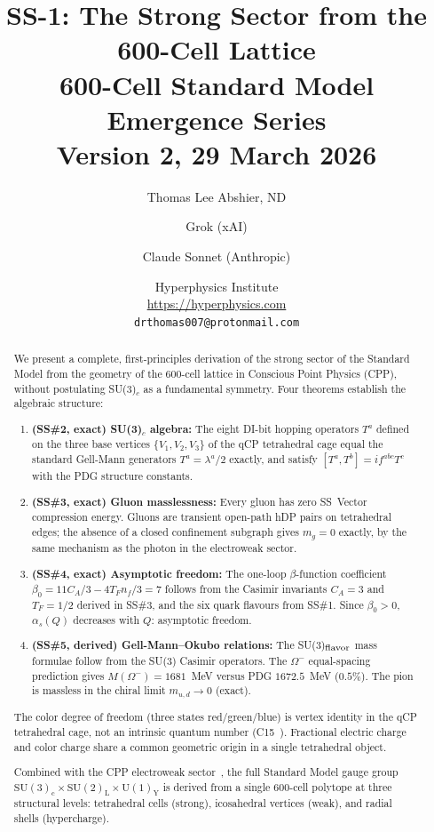 \documentclass[11pt,a4paper]{article}
\title{\textbf{SS-1: The Strong Sector from the 600-Cell Lattice}\\[6pt]
{\large 600-Cell Standard Model Emergence Series}\\[4pt]
{\normalsize Version 2, 29 March 2026}}
\author{Thomas Lee Abshier, ND \and Grok (xAI) \and Claude Sonnet (Anthropic)}
\date{\normalsize Hyperphysics Institute\\
\url{https://hyperphysics.com}\\
\texttt{drthomas007@protonmail.com}}
\newcommand{\as}{\alpha_s}
\begin{document}
\maketitle

\begin{abstract}
We present a complete, first-principles derivation of the strong
sector of the Standard Model from the geometry of the 600-cell
lattice in Conscious Point Physics (CPP), without postulating
SU(3)$_c$ as a fundamental symmetry.  Four theorems establish the
algebraic structure:

\begin{enumerate}
\item \textbf{(SS\#2, exact) SU(3)$_c$ algebra:}
The eight DI-bit hopping operators $T^a$ defined on the three base
vertices $\{V_1, V_2, V_3\}$ of the qCP tetrahedral cage equal
the standard Gell-Mann generators $T^a = \lambda^a/2$ exactly, and
satisfy $[T^a, T^b] = if^{abc}T^c$ with the PDG structure constants.

\item \textbf{(SS\#3, exact) Gluon masslessness:}
Every gluon has zero SS~Vector compression energy.  Gluons are
transient open-path hDP pairs on tetrahedral edges; the absence
of a closed confinement subgraph gives $m_g = 0$ exactly, by the
same mechanism as the photon in the electroweak sector.

\item \textbf{(SS\#4, exact) Asymptotic freedom:}
The one-loop $\beta$-function coefficient
$\beta_0 = 11C_A/3 - 4T_F n_f/3 = 7$
follows from the Casimir invariants $C_A = 3$ and $T_F = 1/2$
derived in SS\#3, and the six quark flavours from SS\#1.  Since
$\beta_0 > 0$, $\as(Q)$ decreases with $Q$: asymptotic freedom.

\item \textbf{(SS\#5, derived) Gell-Mann--Okubo relations:}
The SU(3)$_{\rm flavor}$ mass formulae follow from the SU(3)
Casimir operators.  The $\Omega^-$ equal-spacing prediction gives
$M(\Omega^-) = 1681$~MeV versus PDG $1672.5$~MeV ($0.5\%$).
The pion is massless in the chiral limit $m_{u,d} \to 0$ (exact).
\end{enumerate}

The color degree of freedom (three states red/green/blue) is vertex
identity in the qCP tetrahedral cage, not an intrinsic quantum number
(C15~\citep{c15}).  Fractional electric charge and color charge share
a common geometric origin in a single tetrahedral object.

Combined with the CPP electroweak sector~\citep{cpp_ew_unified}, the
full Standard Model gauge group
$\mathrm{SU(3)_c \times SU(2)_L \times U(1)_Y}$
is derived from a single 600-cell polytope at three structural levels:
tetrahedral cells (strong), icosahedral vertices (weak), and radial
shells (hypercharge).
\end{abstract}
\end{document}
